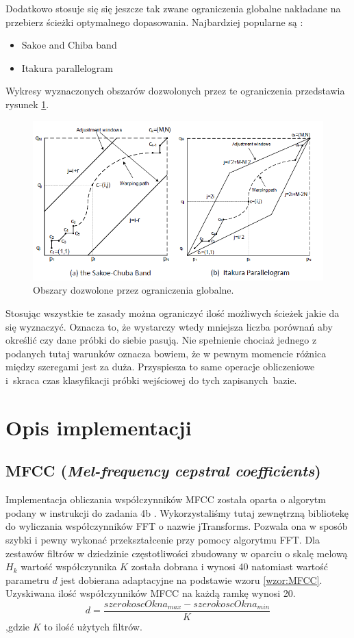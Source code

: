 \documentclass{classrep}
\begin{document}
Dodatkowo stosuje się się jeszcze tak zwane ograniczenia globalne nakładane na przebierz ścieżki optymalnego dopasowania. Najbardziej popularne są :
\begin{itemize}
\item Sakoe and Chiba band
\item Itakura parallelogram
\end{itemize}

Wykresy wyznaczonych obszarów dozwolonych przez te ograniczenia przedstawia rysunek \ref{fig:globalDTW}.

\begin{figure}[h!]
\centering
\includegraphics[width=12cm]{bands.PNG} 
\caption{Obszary dozwolone przez ograniczenia globalne.}
\label{fig:globalDTW}
\end{figure}

Stosując wszystkie te zasady można ograniczyć ilość możliwych ścieżek jakie da się wyznaczyć. Oznacza to, że wystarczy wtedy mniejsza liczba porównań aby określić czy dane próbki do siebie pasują. Nie spełnienie chociaż jednego z podanych tutaj warunków oznacza bowiem, że w pewnym momencie różnica między szeregami jest za duża. Przyspiesza to same operacje obliczeniowe i~skraca czas klasyfikacji próbki wejściowej do tych zapisanych~bazie.

\section{Opis implementacji}
\subsection{MFCC (\textit{Mel-frequency cepstral coefficients})}
Implementacja obliczania współczynników MFCC została oparta o algorytm podany w instrukcji do zadania 4b \cite{1}. Wykorzystaliśmy tutaj zewnętrzną bibliotekę do wyliczania współczynników FFT o nazwie jTransforms. Pozwala ona w sposób szybki i pewny wykonać przekształcenie przy pomocy algorytmu FFT. Dla zestawów filtrów w dziedzinie częstotliwości zbudowany w oparciu o skalę melową $H_{k}$ wartość współczynnika $K$ została dobrana i wynosi 40 natomiast wartość parametru $d$ jest dobierana adaptacyjne na podstawie wzoru \ref{wzor:MFCC}. Uzyskiwana ilość  współczynników MFCC na każdą ramkę wynosi 20. 
\begin{equation}\label{wzor:MFCC}
d=\frac{szerokoscOkna_{max}-szerokoscOkna_{min}}{K}
\end{equation}
,gdzie $K$ to ilość użytych filtrów.
\end{document}

